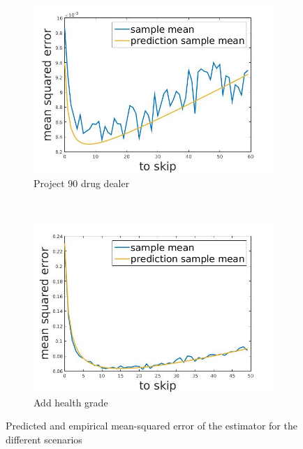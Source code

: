 \documentclass[12pt]{report}
\begin{document}
\begin{figure}[h]    
        \centering
    \begin{subfigure}[b]{0.4\textwidth}
        \includegraphics[width=\textwidth]{pr90dealer}
        \caption{ Project 90 drug dealer  }

    \end{subfigure}
    ~
    \begin{subfigure}[b]{0.4\textwidth}
        \includegraphics[width=\textwidth]{studGrade}
        \caption{ Add health grade }

    \end{subfigure}
    
    \caption{Predicted and empirical mean-squared error of the estimator for the different scenarios}
    \label{fig:energyPrediction}
\end{figure}
\end{document}
